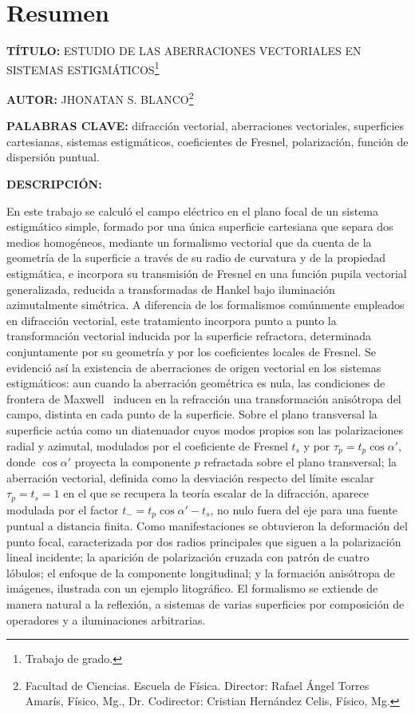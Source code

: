 \clearpage
\chapter*{Resumen}

\noindent\textbf{TÍTULO:} ESTUDIO DE LAS ABERRACIONES VECTORIALES EN SISTEMAS
ESTIGMÁTICOS\footnote{Trabajo de grado.}

\vspace{0.5em}
\noindent\textbf{AUTOR:} JHONATAN S. BLANCO\footnote{Facultad de Ciencias.
Escuela de Física. Director: Rafael Ángel Torres Amarís, Físico, Mg., Dr.
Codirector: Cristian Hernández Celis, Físico, Mg.}

\vspace{0.5em}
\noindent\textbf{PALABRAS CLAVE:} difracción vectorial, aberraciones
vectoriales, superficies cartesianas, sistemas estigmáticos, coeficientes de
Fresnel, polarización, función de dispersión puntual.

\vspace{0.5em}
\noindent\textbf{DESCRIPCIÓN:}

En este trabajo se calculó el campo eléctrico en el plano focal de un sistema
estigmático simple, formado por una única superficie cartesiana que separa
dos medios homogéneos, mediante un formalismo vectorial que da cuenta de la
geometría de la superficie a través de su radio de curvatura y de la
propiedad estigmática, e incorpora su transmisión de Fresnel en una función
pupila vectorial generalizada, reducida a transformadas de Hankel bajo
iluminación azimutalmente simétrica. A diferencia de los formalismos
comúnmente empleados en difracción vectorial, este tratamiento incorpora
punto a punto la transformación vectorial inducida por la superficie
refractora, determinada conjuntamente por su geometría y por los
coeficientes locales de Fresnel. Se evidenció así la existencia de
aberraciones de origen vectorial en los sistemas estigmáticos: aun cuando la
aberración geométrica es nula, las condiciones de frontera de Maxwell~\cite{jackson1999} inducen
en la refracción una transformación anisótropa del campo, distinta en cada
punto de la superficie. Sobre el plano transversal la superficie actúa como
un diatenuador cuyos modos propios son las polarizaciones radial y azimutal,
modulados por el coeficiente de Fresnel $t_s$ y por $\tau_p=t_p\cos\alpha'$,
donde $\cos\alpha'$ proyecta la componente $p$ refractada sobre el plano
transversal; la aberración vectorial, definida como la desviación respecto del
límite escalar $\tau_p=t_s=1$ en el que se recupera la teoría escalar de la
difracción, aparece modulada por el factor $t_-=t_p\cos\alpha'-t_s$, no nulo
fuera del eje para una fuente puntual a distancia finita. Como manifestaciones se obtuvieron la deformación
del punto focal, caracterizada por dos radios principales que siguen a la
polarización lineal incidente; la aparición de polarización cruzada con
patrón de cuatro lóbulos; el enfoque de la componente longitudinal; y la
formación anisótropa de imágenes, ilustrada con un ejemplo litográfico. El
formalismo se extiende de manera natural a la reflexión, a sistemas de varias
superficies por composición de operadores y a iluminaciones arbitrarias.

